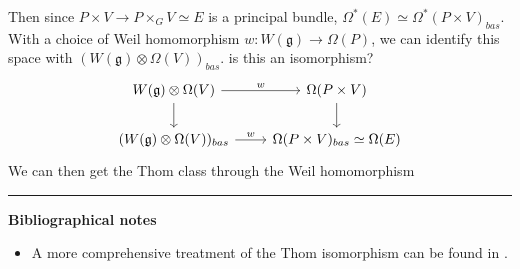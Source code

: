 Then since  $P\times V \to P\times_G V \simeq E$ is a principal bundle,
$\Omega^*(E)\simeq \Omega^*(P\times V)_{bas}$. 
With a choice of Weil homomorphism $w:W(\mathfrak{g}) \to \Omega(P)$, we can
identify this space with $(W(\mathfrak{g})\otimes\Omega(V))_{bas}$. 
is this an isomorphism?
\[\begin{tikzcd}[column sep=2.25em]
		{W(\mathfrak{g})\otimes\Omega(V)} & {\Omega(P\times V)} \\
			{(W(\mathfrak{g})\otimes\Omega(V))_{bas}} & {\Omega(P\times
			V)_{bas}\simeq\Omega(E)}
				\arrow["w", from=1-1, to=1-2]
					\arrow[from=1-1, to=2-1]
						\arrow[from=1-2, to=2-2]
							\arrow["w", from=2-1, to=2-2]
\end{tikzcd}\]
We can then get the Thom class through the Weil homomorphism

\vspace{5mm}
\hrule 
\vspace{5mm}

\textbf{Bibliographical notes}
{\small
\begin{itemize}
	\item A more comprehensive treatment of the Thom isomorphism can be found in
		\citet{bott_tu}.  
\end{itemize}
}
